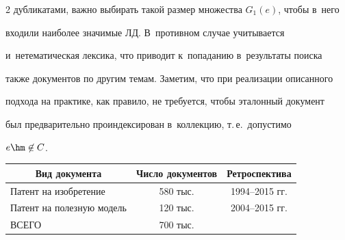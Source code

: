 \begin{multicols}{2}
дубликатами, важно выбирать такой размер множества $G_1(e)$, чтобы в~него 

входили наиболее значимые ЛД. В~противном случае учитывается 

и~нетематическая лексика, что приводит к~попаданию в~результаты поиска 

также документов по другим темам. Заметим, что при реализации описанного 

подхода на практике, как правило, не требуется, чтобы эталонный документ 

был предварительно проиндексирован в~коллекцию, т.\,е.\ до\-пус\-ти\-мо 

$e\hm\not\in C$.



\begin{table}\small %

\begin{center}


\vspace*{2ex}



\begin{tabular}{|l|c|c|}

\hline

\multicolumn{1}{|c|}{Вид документа}&Число документов&Ретроспектива\\

\hline

Патент на изобретение&580 тыс.&1994--2015 гг.\\

Патент на полезную модель&120 тыс.&2004--2015 гг.\\

\hline

ВСЕГО&700 тыс.&\\

\hline

\end{tabular}

\end{center}



\begin{center}



\end{center}
\end{table}
\end{multicols}
